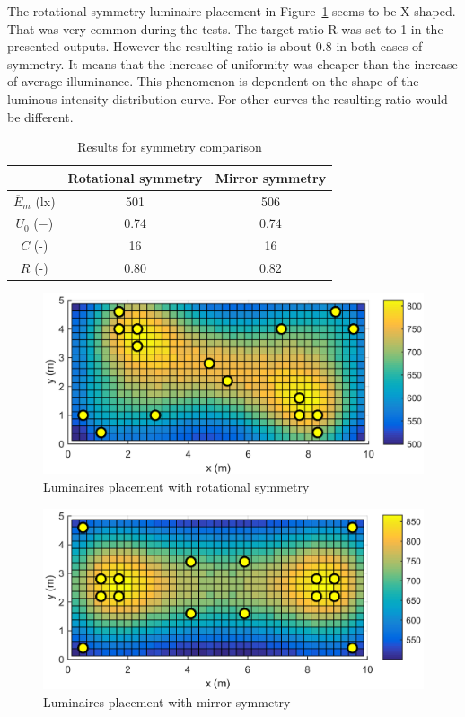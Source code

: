 The rotational symmetry luminaire placement in Figure~\ref{fig:V010_S0} seems to be X shaped. That was very common during the tests. The target ratio R was set to 1 in the presented outputs. However the resulting ratio is about 0.8 in both cases of symmetry. It means that the increase of uniformity was cheaper than the increase of average illuminance. This phenomenon is dependent on the shape of the luminous intensity distribution curve. For other curves the resulting ratio would be different.

\begin{table}[tb]
	\renewcommand{\arraystretch}{1.8}
	\caption{Results for symmetry comparison}
 	\label{tab:symmetry}
	\centering
  \begin{tabular}{| c | c | c |}
    \hline
    & \textbf{Rotational symmetry} & \textbf{Mirror symmetry} \\
    \hline
    $\overline{E}_{m}$ (lx) & 501 & 506 \\
    \hline
		$U_0$ ($-$)& 0.74 & 0.74 \\
    \hline
		$C$ (-) & 16 & 16 \\
	\hline
		$R$ (-) & 0.80 & 0.82 \\
  \hline
  \end{tabular}
\end{table}

\begin{figure}[tb]
  \centering
  \includegraphics[width=\columnwidth]{MSTR_SLB_4x18W_5G4_Fit2_V010_S0}
  \caption{Luminaires placement with rotational symmetry}
  \label{fig:V010_S0}
\end{figure}

\begin{figure}[tb]
  \centering
  \includegraphics[width=\columnwidth]{../Vysledky/MSTR_SLB_4x18W_5G4_Fit2_V010_S1}
  \caption{Luminaires placement with mirror symmetry}
  \label{fig:V010_S1}
\end{figure}

